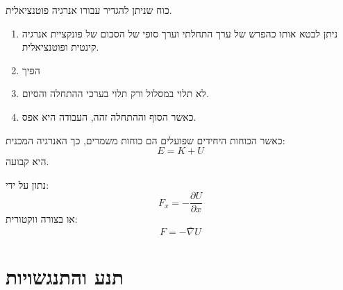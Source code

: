 \documentclass{tstextbook}
\begin{document}
\begin{definition}
כוח שניתן להגדיר עבורו אנרגיה פוטנציאלית. 

\end{definition}
\begin{proposition}
  \begin{enumerate}
    \item ניתן לבטא אותו כהפרש של ערך התחלתי וערך סופי של הסכום של פונקציית אנרגיה קינטית ופוטנציאלית. 


    \item הפיך 


    \item לא תלוי במסלול ורק תלוי בערכי ההתחלה והסיום. 


    \item כאשר הסוף וההתחלה זהה, העבודה היא אפס. 


  \end{enumerate}
\end{proposition}
\begin{corollary}
כאשר הכוחות היחידים שפועלים הם כוחות משמרים, כך האנרגיה המכנית:
$$E=K+U$$
היא קבועה.

\end{corollary}
\begin{proposition}
נתון על ידי:
$$F_{x}=-\frac{\partial U}{\partial x} $$
או בצורה ווקטורית:
$$F=-\bar{\nabla} U$$

\end{proposition}
\section{תנע והתנגשויות}
\end{document}
